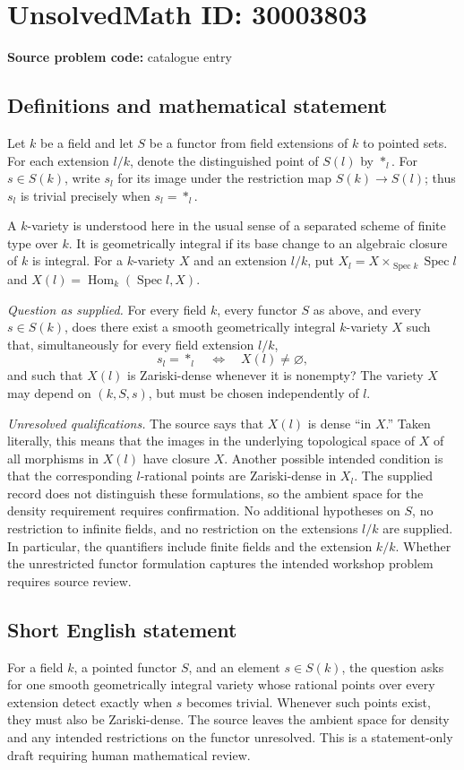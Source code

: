 \documentclass[11pt]{article}
\begin{document}
\section*{UnsolvedMath ID: 30003803}
\textbf{Source problem code:} catalogue entry
\subsection{Definitions and mathematical statement}
Let \(k\) be a field and let \(S\) be a functor from field extensions of \(k\) to pointed sets. For each extension \(l/k\), denote the distinguished point of \(S(l)\) by \(*_l\). For \(s\in S(k)\), write \(s_l\) for its image under the restriction map \(S(k)\to S(l)\); thus \(s_l\) is trivial precisely when \(s_l=*_l\).

A \(k\)-variety is understood here in the usual sense of a separated scheme of finite type over \(k\). It is geometrically integral if its base change to an algebraic closure of \(k\) is integral. For a \(k\)-variety \(X\) and an extension \(l/k\), put \(X_l=X\times_{\operatorname{Spec}k}\operatorname{Spec}l\) and \(X(l)=\operatorname{Hom}_k(\operatorname{Spec}l,X)\).

\emph{Question as supplied.} For every field \(k\), every functor \(S\) as above, and every \(s\in S(k)\), does there exist a smooth geometrically integral \(k\)-variety \(X\) such that, simultaneously for every field extension \(l/k\),
\[
 s_l=*_l\quad\Longleftrightarrow\quad X(l)\ne\varnothing,
\]
and such that \(X(l)\) is Zariski-dense whenever it is nonempty? The variety \(X\) may depend on \((k,S,s)\), but must be chosen independently of \(l\).

\emph{Unresolved qualifications.} The source says that \(X(l)\) is dense ``in \(X\).'' Taken literally, this means that the images in the underlying topological space of \(X\) of all morphisms in \(X(l)\) have closure \(X\). Another possible intended condition is that the corresponding \(l\)-rational points are Zariski-dense in \(X_l\). The supplied record does not distinguish these formulations, so the ambient space for the density requirement requires confirmation. No additional hypotheses on \(S\), no restriction to infinite fields, and no restriction on the extensions \(l/k\) are supplied. In particular, the quantifiers include finite fields and the extension \(k/k\). Whether the unrestricted functor formulation captures the intended workshop problem requires source review.
\subsection{Short English statement}
For a field \(k\), a pointed functor \(S\), and an element \(s\in S(k)\), the question asks for one smooth geometrically integral variety whose rational points over every extension detect exactly when \(s\) becomes trivial. Whenever such points exist, they must also be Zariski-dense. The source leaves the ambient space for density and any intended restrictions on the functor unresolved. This is a statement-only draft requiring human mathematical review.
\end{document}
